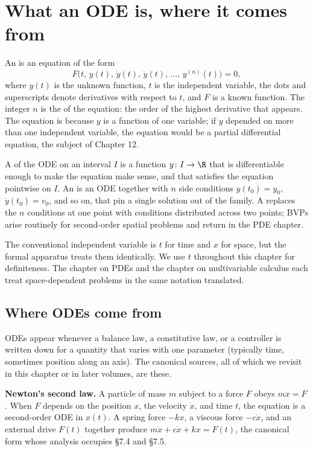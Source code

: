 \section{What an ODE is, where it comes from}

An  is an equation of the
form
\[
F\bigl(t,\, y(t),\, \dot{y}(t),\, \ddot{y}(t),\, \ldots,\, y^{(n)}(t)\bigr) = 0,
\]
where $y(t)$ is the unknown function, $t$ is the independent
variable, the dots and superscripts denote derivatives with respect
to $t$, and $F$ is a known function. The integer $n$ is the
 of the equation: the order of the highest derivative
that appears. The equation is  because $y$ is a
function of one variable; if $y$ depended on more than one
independent variable, the equation would be a partial differential
equation, the subject of Chapter 12.

A  of the ODE on an interval $I$ is a function
$y \colon I \to \R$ that is differentiable enough to make the
equation make sense, and that satisfies the equation pointwise on
$I$. An  is an ODE together
with $n$ side conditions $y(t_{0}) = y_{0}$, $\dot{y}(t_{0}) =
v_{0}$, and so on, that pin a single solution out of the family.
A  replaces the $n$
conditions at one point with conditions distributed across two
points; BVPs arise routinely for second-order spatial problems and
return in the PDE chapter.

The conventional independent variable is $t$ for time and $x$ for
space, but the formal apparatus treats them identically. We use $t$
throughout this chapter for definiteness. The chapter on PDEs and
the chapter on multivariable calculus each treat space-dependent
problems in the same notation translated.

\subsection{Where ODEs come from}

ODEs appear whenever a balance law, a constitutive law, or a
controller is written down for a quantity that varies with one
parameter (typically time, sometimes position along an axis). The
canonical sources, all of which we revisit in this chapter or in
later volumes, are these.

\textbf{Newton's second law.} A particle of mass $m$ subject to a
force $F$ obeys $m \ddot{x} = F$. When $F$ depends on the position
$x$, the velocity $\dot{x}$, and time $t$, the equation is a
second-order ODE in $x(t)$. A spring force $-k x$, a viscous force
$-c \dot{x}$, and an external drive $F(t)$ together produce
$m \ddot{x} + c \dot{x} + k x = F(t)$, the canonical form whose
analysis occupies §7.4 and §7.5.

